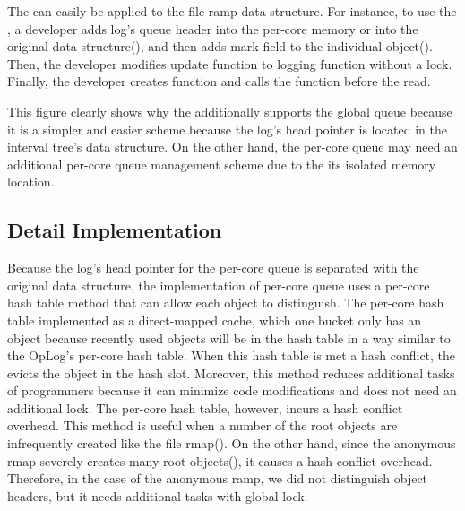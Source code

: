 The \LDU can easily be applied to the file ramp data structure.
For instance, to use the \LDU, a developer adds log's queue header into the per-core
memory or into the original data structure(), and
then adds mark field to the individual object().
Then, the developer modifies update function to logging function without a lock.
Finally, the developer creates  function and calls
the  function before the read.

This figure clearly shows why the \LDU additionally supports the
global queue because it is a simpler and easier scheme because the log's head
pointer is located in the interval tree's data structure.
On the other hand, the
per-core queue may need an additional per-core queue management scheme due
to the its isolated memory location.

\subsection{Detail Implementation}
Because the log's head pointer for the per-core queue is
separated with the original data structure, the implementation of
per-core queue uses 
a per-core hash table method that can allow each object to distinguish.
The per-core hash table implemented as a direct-mapped cache, which one
bucket only has an object because recently used objects will be in the hash
table in a way similar to the OpLog's per-core hash table.
When this hash table is met a hash conflict, the \LDU evicts the object in the
hash slot.
Moreover, this method reduces additional tasks of programmers because it can
minimize code modifications and does not need an additional lock.
The per-core hash table, however, incurs a hash conflict overhead.
This method is useful when a number of the root objects are infrequently created like the 
file rmap().
On the other hand, since the anonymous rmap severely creates many
root objects(), it causes a hash conflict overhead.
Therefore, in the case of the anonymous ramp, we did not distinguish object
headers, but it needs additional tasks with global lock.

